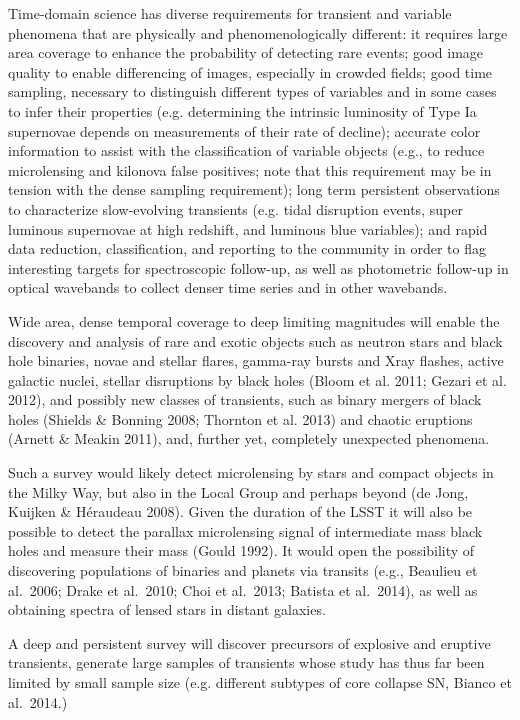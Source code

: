 Time-domain science has diverse requirements for transient and
variable phenomena that are physically and phenomenologically
different: it requires large area coverage to enhance the probability
of detecting rare events; good image quality to enable differencing of
images, especially in crowded fields; good time sampling, necessary to
distinguish different types of variables and in some cases to infer
their properties (e.g. determining the intrinsic luminosity of Type Ia
supernovae depends on measurements of their rate of decline); accurate
color information to assist with the classification of variable
objects (e.g., to reduce microlensing and kilonova false positives;
note that this requirement may be in tension with the dense sampling requirement); long term
persistent observations to characterize slow-evolving transients
(e.g. tidal disruption events, super luminous supernovae at high
redshift, and luminous blue variables); and rapid data reduction,
classification, and reporting to the community in order to flag
interesting targets for spectroscopic follow-up, as well as
photometric follow-up in optical wavebands to collect denser time
series and in other wavebands.

Wide area, dense temporal coverage to deep limiting magnitudes will
enable the discovery and analysis of rare and exotic objects such as
neutron stars and black hole binaries, novae and stellar flares,
gamma-ray bursts and Xray flashes, active galactic nuclei, stellar
disruptions by black holes (Bloom et al. 2011; Gezari et al. 2012),
and possibly new classes of transients, such as binary mergers of
black holes (Shields \& Bonning 2008; Thornton et al. 2013) and chaotic
eruptions (Arnett \& Meakin 2011), and, further yet, completely
unexpected phenomena.

Such a survey would likely detect microlensing by stars and compact objects in
the Milky Way, but also in the Local Group and perhaps beyond (de Jong, Kuijken
\& H\'{e}raudeau 2008). Given the duration of the LSST it will also be possible
to detect the parallax microlensing signal of intermediate mass black holes and
measure their mass (Gould 1992). It would open the possibility of
discovering populations of binaries and planets via transits (e.g., Beaulieu et
al.~2006; Drake et al.~2010; Choi et al.~2013; Batista et al.~2014), as well as
obtaining spectra of lensed stars in distant galaxies.

A deep and persistent survey will discover precursors of explosive and
eruptive transients, generate large samples of transients whose study
has thus far been limited by small sample size (e.g. different
subtypes of core collapse SN, Bianco et al.~2014.)

